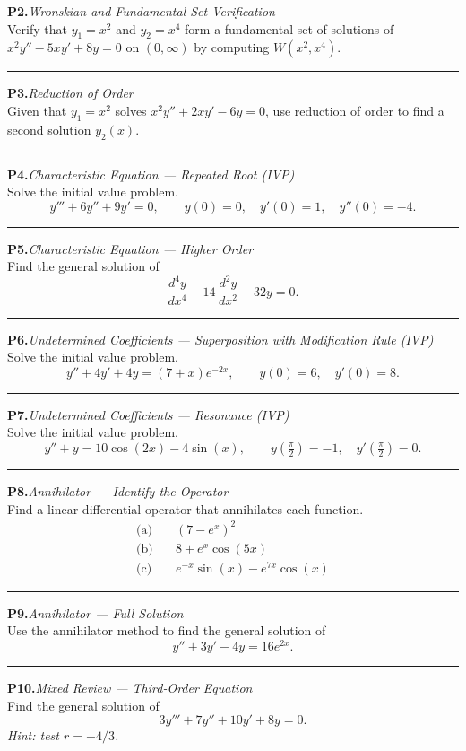 \documentclass[10pt]{article}
\newcommand{\m}[1]{$#1$}
\newcommand{\annotspace}[1][3.5cm]{\vspace{#1}}
\begin{document}
\noindent\textbf{P2.}\quad\textit{Wronskian and Fundamental Set Verification}\\
Verify that \m{y_1 = x^2} and \m{y_2 = x^4} form a fundamental set of solutions of
\m{x^2 y'' - 5xy' + 8y = 0} on \m{(0,\infty)} by computing \m{W(x^2, x^4)}.
\annotspace[5.5cm]

\hrule\medskip

\noindent\textbf{P3.}\quad\textit{Reduction of Order}\\
Given that \m{y_1 = x^2} solves \m{x^2 y'' + 2xy' - 6y = 0}, use reduction of order to find a
second solution \m{y_2(x)}.
\annotspace[6cm]

\hrule\medskip

\noindent\textbf{P4.}\quad\textit{Characteristic Equation --- Repeated Root (IVP)}\\
Solve the initial value problem.
\[
    y''' + 6y'' + 9y' = 0, \qquad y(0) = 0,\quad y'(0) = 1,\quad y''(0) = -4.
\]
\annotspace[6cm]

\hrule\medskip

\noindent\textbf{P5.}\quad\textit{Characteristic Equation --- Higher Order}\\
Find the general solution of
\[
    \frac{d^4y}{dx^4} - 14\,\frac{d^2y}{dx^2} - 32y = 0.
\]
\annotspace[5.5cm]

\hrule\medskip

\noindent\textbf{P6.}\quad\textit{Undetermined Coefficients --- Superposition with Modification Rule (IVP)}\\
Solve the initial value problem.
\[
    y'' + 4y' + 4y = (7 + x)e^{-2x}, \qquad y(0) = 6,\quad y'(0) = 8.
\]
\annotspace[6cm]

\hrule\medskip

\noindent\textbf{P7.}\quad\textit{Undetermined Coefficients --- Resonance (IVP)}\\
Solve the initial value problem.
\[
    y'' + y = 10\cos(2x) - 4\sin(x), \qquad
    y\!\left(\tfrac{\pi}{2}\right) = -1,\quad y'\!\left(\tfrac{\pi}{2}\right) = 0.
\]
\annotspace[6cm]

\hrule\medskip

\noindent\textbf{P8.}\quad\textit{Annihilator --- Identify the Operator}\\
Find a linear differential operator that annihilates each function.
\begin{align*}
    \text{(a)}\quad &(7 - e^x)^2 \\[4pt]
    \text{(b)}\quad &8 + e^x\cos(5x) \\[4pt]
    \text{(c)}\quad &e^{-x}\sin(x) - e^{7x}\cos(x)
\end{align*}
\annotspace[5.5cm]

\hrule\medskip

\noindent\textbf{P9.}\quad\textit{Annihilator --- Full Solution}\\
Use the annihilator method to find the general solution of
\[
    y'' + 3y' - 4y = 16e^{2x}.
\]
\annotspace[6cm]

\hrule\medskip

\noindent\textbf{P10.}\quad\textit{Mixed Review --- Third-Order Equation}\\
Find the general solution of
\[
    3y''' + 7y'' + 10y' + 8y = 0.
\]
\textit{Hint: test \m{r = -4/3}.}
\annotspace[8cm]
\end{document}

